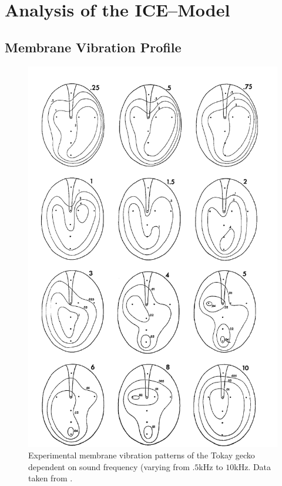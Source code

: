 \chapter{Analysis of the ICE--Model}

\section{Membrane Vibration Profile}
\begin{figure}[ht!]
 \centering
 \includegraphics[width=.5\linewidth]{Diagrams/manleygeckoear2.png}
 \caption[Tokay gecko tympanum vibration profiles.]{Experimental membrane vibration patterns of the Tokay gecko dependent
 on sound frequency (varying from $.5$kHz to $10$kHz. Data taken from \cite{manleygecko1}.}
  \label{manleygeckotympanum}
\end{figure}